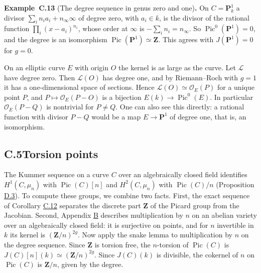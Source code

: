 \documentclass[11pt]{article}
\newenvironment{bpstatement}[2]{\par\addvspace{0.6\baselineskip}\noindent\textbf{#1}#2\textbf{.}\enspace\ignorespaces}
  {\par\addvspace{0.4\baselineskip}}
\begin{document}
\label{bp159}%
\begin{bpstatement}{Example~C.13}{ (The degree sequence in genus zero and one)}
On \(C=\mathbf P^1_k\) a divisor \(\sum_in_ia_i+n_\infty\infty\) of degree zero, with \(a_i\in k\), is the divisor of the rational function \(\prod_i(x-a_i)^{n_i}\), whose order at \(\infty\) is \(-\sum_in_i=n_\infty\). So \(\operatorname{Pic}^0(\mathbf P^1)=0\), and the degree is an isomorphism \(\operatorname{Pic}(\mathbf P^1)\simeq\mathbf Z\). This agrees with \(J(\mathbf P^1)=0\) for \(g=0\).

On an elliptic curve \(E\) with origin \(O\) the kernel is as large as the curve. Let \(\mathcal L\) have degree zero. Then \(\mathcal L(O)\) has degree one, and by Riemann–Roch with \(g=1\) it has a one-dimensional space of sections. Hence \(\mathcal L(O)\simeq\mathcal O_E(P)\) for a unique point \(P\), and \(P\mapsto\mathcal O_E(P-O)\) is a bijection \(E(k)\to\operatorname{Pic}^0(E)\). In particular \(\mathcal O_E(P-Q)\) is nontrivial for \(P\neq Q\). One can also see this directly: a rational function with divisor \(P-Q\) would be a map \(E\to\mathbf P^1\) of degree one, that is, an isomorphism.
\end{bpstatement}


\subsection*{\texorpdfstring{C.5\quad Torsion points}{C.5 Torsion points}}
\label{bp160}%
\label{bp161}%
The Kummer sequence on a curve \(C\) over an algebraically closed field identifies \(H^1(C,\mu_n)\) with \(\operatorname{Pic}(C)[n]\) and \(H^2(C,\mu_n)\) with \(\operatorname{Pic}(C)/n\) (Proposition \hyperref[bp181]{D.3}). To compute these groups, we combine two facts. First, the exact sequence of Corollary \hyperref[bp157]{C.12} separates the discrete part \(\mathbf Z\) of the Picard group from the Jacobian. Second, Appendix \hyperref[bp75]{B} describes multiplication by \(n\) on an abelian variety over an algebraically closed field: it is surjective on points, and for \(n\) invertible in \(k\) its kernel is \((\mathbf Z/n)^{2g}\). Now apply the snake lemma to multiplication by \(n\) on the degree sequence. Since \(\mathbf Z\) is torsion free, the \(n\)-torsion of \(\operatorname{Pic}(C)\) is \(J(C)[n](k)\simeq(\mathbf Z/n)^{2g}\). Since \(J(C)(k)\) is divisible, the cokernel of \(n\) on \(\operatorname{Pic}(C)\) is \(\mathbf Z/n\), given by the degree.
\end{document}
